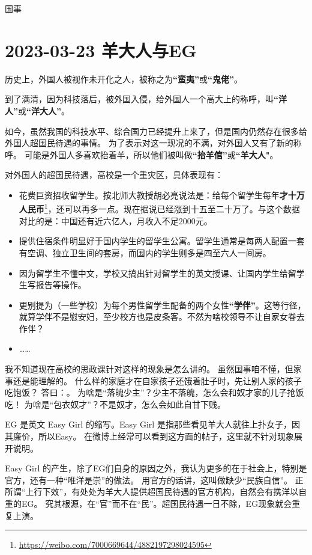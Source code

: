 \begin{taged}{国事}
\section{2023-03-23 羊大人与EG}
\end{taged}

历史上，外国人被视作未开化之人，被称之为\textbf{“蛮夷”}或\textbf{“鬼佬”}。

到了满清，因为科技落后，被外国入侵，给外国人一个高大上的称呼，叫\textbf{“洋人”}或\textbf{“洋大人”}。

如今，虽然我国的科技水平、综合国力已经提升上来了，但是国内仍然存在很多给外国人超国民待遇的事情。
为了表示对这一现况的不满，对外国人又有了新的称呼。
可能是外国人多喜欢抬着羊，所以他们被叫做\textbf{“抬羊倌”}或\textbf{“羊大人"}。

对外国人的超国民待遇，高校是一个重灾区，具体表现有：

\begin{itemize}[nosep, left=\parindent]
    \item 花费巨资招收留学生。按北师大教授胡必亮说法是：给每个留学生每年\textbf{才十万人民币}\footnote{\url{https://weibo.com/7000669644/4882197298024595}}，还可以再多一点。现在据说已经涨到十五至二十万了。与这个数据对比的是：中国还有近六亿人，月收入不足2000元。
    \item 提供住宿条件明显好于国内学生的留学生公寓。留学生通常是每两人配置一套有空调、独立卫生间的套房，而国内的学生则多是四至六人一间房。
    \item 因为留学生不懂中文，学校又搞出针对留学生的英文授课、让国内学生给留学生写报告等操作。
    \item 更别提为（一些学校）为每个男性留学生配备的两个女性\textbf{“学伴”}。这等行径，就算学伴不是慰安妇，至少校方也是皮条客。不然为啥校领导不让自家女眷去作伴？
    \item ……
\end{itemize}

我不知道现在高校的思政课针对这样的现象是怎么讲的。
虽然国事咱不懂，但家事还是能理解的。
什么样的家庭才在自家孩子还饿着肚子时，先让别人家的孩子吃饱饭？
答曰：。
为啥是“落魄少主”？少主不落魄，怎么会和奴才家的儿子抢饭吃！
为啥是“包衣奴才”？不是奴才，怎么会如此自甘下贱。

\contentsep

EG 是英文 Easy Girl 的缩写。Easy Girl 是指那些看见羊大人就往上扑女子，因其廉价，所以Easy。
在微博上经常可以看到这方面的帖子，这里就不针对现象展开说明。

Easy Girl 的产生，除了EG们自身的原因之外，我认为更多的在于社会上，特别是官方，还有一种“唯洋是崇”的做法。
用官方的话讲，这叫做缺少“民族自信”。
正所谓“上行下效”，有处处为羊大人提供超国民待遇的官方机构，自然会有携洋以自重的EG。
究其根源，在“官”而不在“民”。超国民待遇一日不除，EG现象就会重复上演。

